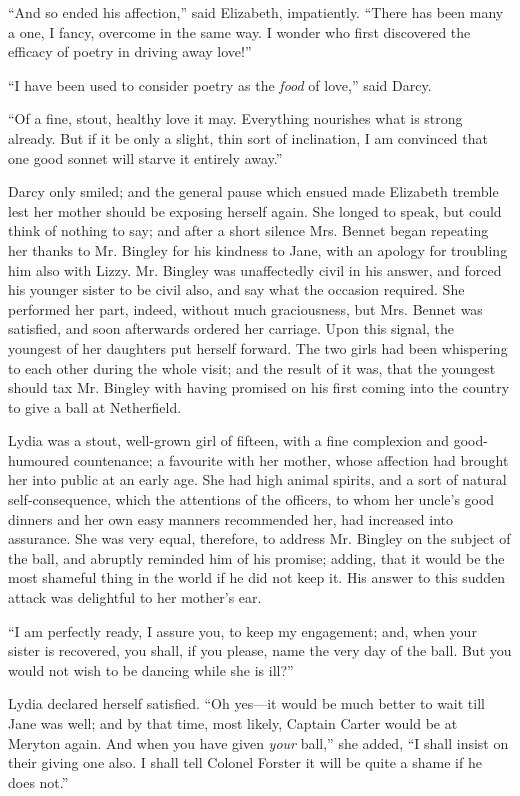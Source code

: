 \documentclass[12pt,openright]{book}
\begin{document}
“And so ended his affection,” said Elizabeth, impatiently. “There has been many a one, I fancy, overcome in the same way. I wonder who first discovered the efficacy of poetry in driving away love!”

“I have been used to consider poetry as the \textit{food} of love,” said Darcy.

“Of a fine, stout, healthy love it may. Everything nourishes what is strong already. But if it be only a slight, thin sort of inclination, I am convinced that one good sonnet will starve it entirely away.”

Darcy only smiled; and the general pause which ensued made Elizabeth tremble lest her mother should be exposing herself again. She longed to speak, but could think of nothing to say; and after a short silence Mrs. Bennet began repeating her thanks to Mr. Bingley for his kindness to Jane, with an apology for troubling him also with Lizzy. Mr. Bingley was unaffectedly civil in his answer, and forced his younger sister to be civil also, and say what the occasion required. She performed her part, indeed, without much graciousness, but Mrs. Bennet was satisfied, and soon afterwards ordered her carriage. Upon this signal, the youngest of her daughters put herself forward. The two girls had been whispering to each other during the whole visit; and the result of it was, that the youngest should tax Mr. Bingley with having promised on his first coming into the country to give a ball at Netherfield.

Lydia was a stout, well-grown girl of fifteen, with a fine complexion and good-humoured countenance; a favourite with her mother, whose affection had brought her into public at an early age. She had high animal spirits, and a sort of natural self-consequence, which the attentions of the officers, to whom her uncle’s good dinners and her own easy manners recommended her, had increased into assurance. She was very equal, therefore, to address Mr. Bingley on the subject of the ball, and abruptly reminded him of his promise; adding, that it would be the most shameful thing in the world if he did not keep it. His answer to this sudden attack was delightful to her mother’s ear.

“I am perfectly ready, I assure you, to keep my engagement; and, when your sister is recovered, you shall, if you please, name the very day of the ball. But you would not wish to be dancing while she is ill?”

Lydia declared herself satisfied. “Oh yes—it would be much better to wait till Jane was well; and by that time, most likely, Captain Carter would be at Meryton again. And when you have given \textit{your} ball,” she added, “I shall insist on their giving one also. I shall tell Colonel Forster it will be quite a shame if he does not.”
\end{document}
